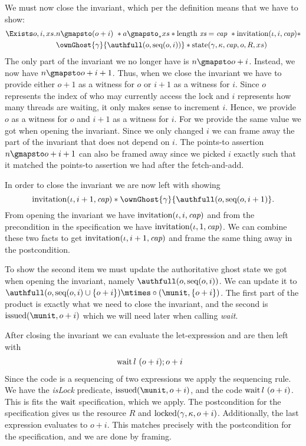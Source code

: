 We must now close the invariant, which per the definition means that we have to
show:
\begin{align*}
\Exists o, i, xs.
    & n \gmapsto (o + i) \ \ast a \gmapsto_{*} xs \ast \length\ \xs = \Cap\ \ast
    \invitation(\iota, i, \Cap) \ast \\
    & \ownGhost{\gamma}{\authfull ( o, \seq(o, i))} \ast
     \text{state}(\gamma, \kappa, \Cap, o, R, xs)
\end{align*}
The only part of the invariant we no longer have is $n \gmapsto o + i$. Instead,
we now have $n \gmapsto o + i + 1$. Thus, when we close the invariant we have to
provide either $o + 1$ as a witness for $o$ or $i + 1$ as a witness for $i$.
Since $o$ represents the index of who may currently access the lock and $i$
represents how many threads are waiting, it only makes sense to increment $i$.
Hence, we provide $o$ as a witness for $o$ and $i + 1$ as a witness for $i$. For
\xs we provide the same value we got when opening the invariant. Since we only
changed $i$ we can frame away the part of the invariant that does not depend on
$i$. The points-to assertion $n \gmapsto o + i + 1$ can also be framed away
since we picked $i$ exactly such that it matched the points-to assertion we had
after the fetch-and-add.

In order to close the invariant we are now left with showing
\[
  \invitation(\iota, i + 1, \Cap) \ast \ownGhost{\gamma}{\authfull(o, \seq(o, i + 1)}.
\]
From opening the invariant we have $\operatorname{invitation}(\iota, i, \textit{cap})$ and from the
precondition in the specification we have $\operatorname{invitation}(\iota, 1, \textit{cap})$. We can
combine these two facts to get $\operatorname{invitation}(\iota, i + 1, \textit{cap})$ and frame the
same thing away in the postcondition.

To show the second item we must update the authoritative ghost state we got when
opening the invariant, namely $\authfull(o, \seq(o, i))$. We can update it to
$\authfull(o, \seq(o, i) \cup \{ o + i \}) \mtimes \circ(\munit, \{ o + i \})$.
The first part of the product is exactly what we need to close the invariant,
and the second is $\issued(\munit, o + i)$ which we will need later when calling
\textit{wait}.

After closing the invariant we can evaluate the let-expression and are then left with
\begin{align*}
  & \operatorname{wait} l\ (o + i); o + i
\end{align*}
Since the code is a sequencing of two expressions we apply the sequencing rule.
We have the \textit{isLock} predicate, $\issued(\munit, o + i)$, and the code
$\operatorname{wait} l\ (o + i)$. This is fits the $\operatorname{wait}$ specification, which we apply. The
postcondition for the specification gives us the resource $R$ and
$\operatorname{locked}(\gamma, \kappa, o + i)$. Additionally, the last expression evaluates to
$o + i$. This matches precisely with the postcondition for the specification,
and we are done by framing.


